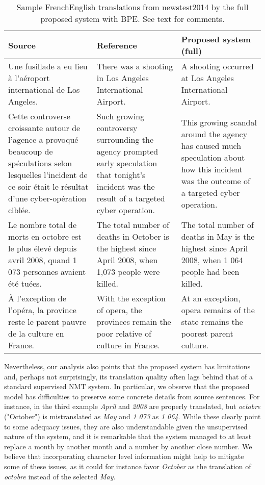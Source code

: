 \documentclass{article} \usepackage{iclr2018_conference,times}
\begin{document}
\begin{table*}[t]
\caption{Sample FrenchEnglish translations from newstest2014 by the full proposed system with BPE. See text for comments.} \label{tab:examples}
\begin{small}
\begin{center}
  \begin{tabular}{p{4.1cm}p{4.1cm}p{4.1cm}}
    \toprule
    \bf Source & \bf Reference & \bf Proposed system (full) \\
    \midrule
    Une fusillade a eu lieu à l'aéroport international de Los Angeles. & There was a shooting in Los Angeles International Airport. & A shooting occurred at Los Angeles International Airport.\\
    \midrule
    Cette controverse croissante autour de l'agence a provoqué beaucoup de spéculations selon lesquelles l'incident de ce soir était le résultat d'une cyber-opération ciblée. & Such growing controversy surrounding the agency prompted early speculation that tonight's incident was the result of a targeted cyber operation. & This growing scandal around the agency has caused much speculation about how this incident was the outcome of a targeted cyber operation. \\
    \midrule
    Le nombre total de morts en octobre est le plus élevé depuis avril 2008, quand 1 073 personnes avaient été tuées. & The total number of deaths in October is the highest since April 2008, when 1,073 people were killed. & The total number of deaths in May is the highest since April 2008, when 1 064 people had been killed. \\
    \midrule
    À l'exception de l'opéra, la province reste le parent pauvre de la culture en France. & With the exception of opera, the provinces remain the poor relative of culture in France. & At an exception, opera remains of the state remains the poorest parent culture. \\
    \bottomrule
  \end{tabular}
\end{center}
\end{small}
\end{table*}

Nevertheless, our analysis also points that the proposed system has limitations and, perhaps not surprisingly, its translation quality often lags behind that of a standard supervised NMT system. In particular, we observe that the proposed model has difficulties to preserve some concrete details from source sentences. For instance, in the third example \textit{April} and \textit{2008} are properly translated, but \textit{octobre} ("October") is mistranslated as \textit{May} and \textit{1 073} as \textit{1 064}. While these clearly point to some adequacy issues, they are also understandable given the unsupervised nature of the system, and it is remarkable that the system managed to at least replace a month by another month and a number by another close number. We believe that incorporating character level information might help to mitigate some of these issues, as it could for instance favor \textit{October} as the translation of \textit{octobre} instead of the selected \textit{May}.
\end{document}
